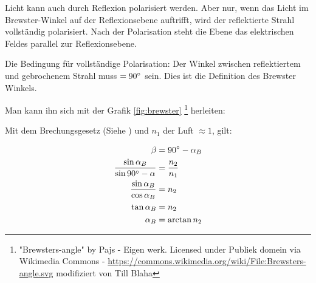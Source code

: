 Licht kann auch durch Reflexion polarisiert werden. Aber nur, wenn das Licht im Brewster-Winkel auf der Reflexionsebene auftrifft, wird der reflektierte Strahl vollständig polarisiert. Nach der Polarisation steht die Ebene das elektrischen Feldes parallel zur Reflexionsebene.

Die Bedingung für vollständige Polarisation: Der Winkel zwischen reflektiertem und gebrochenem Strahl muss $= 90\degree$ sein. Dies ist die Definition des Brewster Winkels.

Man kann ihn sich mit der Grafik \ref{fig:brewster} \footnote{"Brewsters-angle" by Pajs - Eigen werk. Licensed under Publiek domein via Wikimedia Commons - \url{https://commons.wikimedia.org/wiki/File:Brewsters-angle.svg} modifiziert von Till Blaha} herleiten:

Mit dem Brechungsgesetz (Siehe ) und $n_1$ der Luft $\approx 1$, gilt:

\begin{align}
\begin{split}
	\beta &= 90\degree - \alpha_B \\
	\frac{\sin{\alpha_B}}{\sin{90\degree - \alpha}} &= \frac{n_2}{n_1} \\
	\frac{\sin{\alpha_B}}{\cos{\alpha_B}} &= n_2 \\
	\tan{\alpha_B} &= n_2 \\
	\alpha_B &= \arctan{n_2}
\end{split}
\end{align}